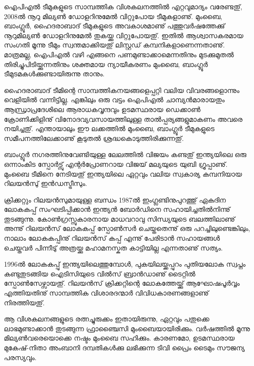 \vskip 1pt

ഐപിഎല്‍ ടീമുകളുടെ സാമ്പത്തിക വിശകലനത്തില്‍ എറ്റവുമാദ്യം വരേണ്ടതു്, 2008ല്‍ നൂറു മില്യണ്‍ ഡോളറിനുമേല്‍ 
വിറ്റുപോയ ടീമുകളാണു്. മുംബൈ, ബാംഗ്ലൂര്‍, ഹൈദരാബാദ് ടീമുകളുടെ അവകാശമാണു് പത്തുവര്‍ഷത്തേക്കു് 
നൂറുമില്യണ്‍ ഡോളറിനുമേല്‍ തുകയ്ക്കു വിറ്റുപോയതു്. ഇതില്‍ ആശ്വാസകരമായ സംഗതി മൂന്നു ടീമും സ്വന്തമാക്കിയതു് 
ലിസ്റ്റഡ് കമ്പനികളാണെന്നതാണു്. മാത്രമല്ല, ഐപിഎല്‍ വഴി എങ്ങനെ പണമുണ്ടാക്കാമെന്നതിനും 
മുടക്കുമുതല്‍ തിരിച്ചുപിടിയ്ക്കുന്നതിനും ശക്തമായ ന്യായീകരണം മുംബൈ, ബാംഗ്ലൂര്‍ ടീമുടമകള്‍ക്കുണ്ടായിരുന്നു താനും. 

ഹൈദരാബാദ് ടീമിന്റെ സാമ്പത്തികനയങ്ങളെപ്പറ്റി വലിയ വിവരങ്ങളൊന്നും വെളിയില്‍ വന്നിട്ടില്ല. എങ്കിലും ഒരു വട്ടം 
ഐപിഎല്‍ ചാമ്പ്യന്‍മാരായതും ആന്ധ്രാപ്രദേശിലെ ആരാധകവൃന്ദവും ഉടമസ്ഥരായ ഡെക്കാണ്‍ ക്രോണിക്കിളിനു് 
വിനോദവ്യവസായത്തിലുള്ള താല്‍പ്പര്യങ്ങളുമാകണം അവരെ നയിച്ചതു്. എന്തായാലും ഈ ലക്കത്തില്‍ മുംബൈ, 
ബാംഗ്ലൂര്‍ ടീമുകളുടെ സമീപനത്തിലേക്കാണു് കൂടുതല്‍ ശ്രദ്ധകൊടുത്തിരിക്കുന്നതു്.

ബാംഗ്ലൂര്‍ നഗരത്തിനുവേണ്ടിയുള്ള ലേലത്തില്‍ വിജയം കണ്ടതു് ഇന്ത്യയിലെ ഒരു ഒന്നാംകിട സ്പോര്‍ട്സു് എന്റര്‍പ്രോണറായ 
വിജയ് മല്യയുടെ യുബി ഗ്രൂപ്പാണു്. മുംബൈ ടീമിനെ നേടിയതു് ഇന്ത്യയിലെ ഏറ്റവും വലിയ സ്വകാര്യ കമ്പനിയായ റിലയന്‍സു് 
ഇന്‍ഡസ്ട്രീസും.


ക്രിക്കറ്റും റിലയന്‍സുമായുള്ള ബന്ധം 1987ല്‍ ഇംഗ്ലണ്ടിനുപുറത്തു് ഏകദിന ലോകകപ്പ് 
സംഘടിപ്പിക്കാന്‍ ഇന്ത്യന്‍ ബോര്‍ഡിനെ സഹായിച്ചതില്‍നിന്നു് തുടങ്ങുന്നു. കോണ്‍ഗ്രസ്സുകാരനായ മാധവറാവു സിന്ധ്യയുടെ ബലത്തിലാണു് 
അന്നു് റിലയന്‍സ് ലോകകപ്പ് സ്പോണ്‍സര്‍ ചെയ്തതെന്നു് ഒരു പറച്ചിലുണ്ടെങ്കിലും, നാലാം ലോകകപ്പിനു് റിലയന്‍സ് 
കപ്പ് എന്നു് പേരിടാന്‍ സഹായങ്ങള്‍ ചെയ്തവര്‍ പിന്നീടു് അത്രയ്ക്കു മഹാമനസ്കത കാട്ടിയില്ല എന്നതാണു് സത്യം.

1996ല്‍ ലോകകപ്പു് ഇന്ത്യയിലെത്തുമ്പോള്‍, പുകയിലയ്ക്കപ്പുറം പുതിയലോക സ്വപ്നം കണ്ടുതുടങ്ങിയ ഐടിസിയുടെ 
വില്‍സ് ബ്രാന്‍ഡാണു് ടൈറ്റില്‍ സ്പോണ്‍സേഴ്സായതു്. റിലയന്‍സ് ക്രിക്കറ്റിന്റെ ലോകത്തേയ്ക്കു് ആഘോഷപൂര്‍‌വ്വം 
എത്തിയതിനു് സാമ്പത്തിക വിശാരദന്മാര്‍ വിവിധകാരണങ്ങളാണു് നിരത്തിയതു്.

ആ വിശകലനങ്ങളുടെ രത്നച്ചുരുക്കം ഇതായിരുന്നു, ഏറ്റവും പതുക്കെ ലാഭമുണ്ടാക്കാന്‍ തുടങ്ങുന്ന ഫ്രാഞ്ചൈസി 
മുംബൈയായിരിക്കും. വര്‍ഷത്തില്‍ മൂന്നു മില്യണ്‍വരെയൊക്കെ നഷ്ടം മുംബൈ സഹിക്കും. കാരണമോ, 
ഉടമസ്ഥരായ മുകേഷ്-നിതാ അംബാനി ദമ്പതികള്‍ക്കു ലഭിക്കുന്ന ടിവി പ്രൈം ടൈമും സൗജന്യ പരസ്യവും.


